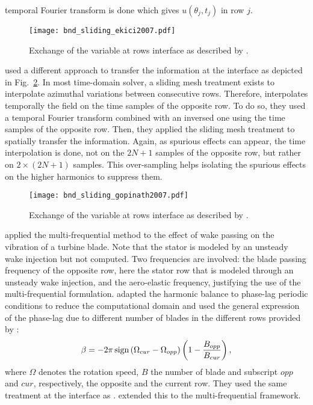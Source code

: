 temporal Fourier transform is done which gives $u (\theta_j, t_j)$
in row $j$.
\begin{figure}[htbp]
  \centering
  \texttt{[image: bnd\_sliding\_ekici2007.pdf]}
  \caption{Exchange of the variable at rows interface as described by \citet{Ekici2007}.}
  \label{fig:bnd_sliding_ekici2007}
\end{figure}
\citet{Gopinath2007} used a different approach to transfer
the information at the interface as depicted
in Fig.~\ref{fig:bnd_sliding_gopinath2007}. In most time-domain solver,
a sliding mesh treatment exists to interpolate azimuthal variations
between consecutive rows. Therefore, \citet{Gopinath2007}
interpolates temporally the field on the time samples
of the opposite row. To do so, they used a temporal Fourier
transform combined with an inversed one using the time samples
of the opposite row.
Then, they applied the sliding mesh treatment
to spatially transfer the information. Again, as spurious effects
can appear, the time interpolation is done, not on the $2N+1$ samples
of the opposite row, but rather on $2 \times (2N+1)$ samples. This over-sampling
helps isolating the spurious effects on the higher harmonics to suppress them.
\begin{figure}[htbp]
  \centering
  \texttt{[image: bnd\_sliding\_gopinath2007.pdf]}
  \caption{Exchange of the variable at rows interface as described by \citet{Gopinath2007}.}
  \label{fig:bnd_sliding_gopinath2007}
\end{figure}
\citet{Ekici2008a} applied the multi-frequential method
to the effect of wake passing on the vibration of
a turbine blade. Note that the stator is modeled
by an unsteady wake injection but not computed.
Two frequencies are involved: the blade passing
frequency of the opposite row, here the
stator row that is modeled through an unsteady wake injection,
and the aero-elastic frequency, justifying the use
of the multi-frequential formulation.
\citet{JSicot2012} adapted the harmonic balance 
to phase-lag periodic 
conditions to reduce the computational domain
and used the general expression of the phase-lag due to
different number of blades in the different rows 
provided by \citet{Gerolymos1991}:
\begin{equation}
 	\beta = - 2 \pi \operatorname{sign} \left(\Omega_{cur} - \Omega_{opp} \right) 
 	\left(1 - \frac{B_{opp}}{B_{cur}}\right),
\end{equation} 
where $\Omega$ denotes the rotation speed, $B$ the number
of blade and subscript $opp$ and $cur$, respectively, the
opposite and the current row. They used the same treatment
at the interface as \citet{Gopinath2007}.
\citet{ThesisGuedeney} extended this to the multi-frequential framework.

